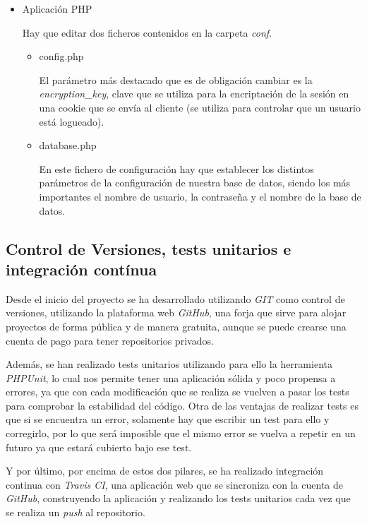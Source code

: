 \begin{itemize}
		\item Aplicación PHP

			Hay que editar dos ficheros contenidos en la carpeta \emph{conf}.

			\begin{itemize}
				\item config.php

				El parámetro más destacado que es de obligación cambiar es la \emph{encryption\_key}, clave que se utiliza para la encriptación de la sesión en una cookie que se envía al cliente (se utiliza para controlar que un usuario está logueado).

				\item database.php

				En este fichero de configuración hay que establecer los distintos parámetros de la configuración de nuestra base de datos, siendo los más importantes el nombre de usuario, la contraseña y el nombre de la base de datos.

			\end{itemize}

	\end{itemize}

\subsection{Control de Versiones, tests unitarios e integración contínua}

Desde el inicio del proyecto se ha desarrollado utilizando \emph{GIT} como control de versiones, utilizando la plataforma web \emph{GitHub}, una forja que sirve para alojar proyectos de forma pública y de manera gratuita, aunque se puede crearse una cuenta de pago para tener repositorios privados.

Además, se han realizado tests unitarios utilizando para ello la herramienta \emph{PHPUnit}, lo cual nos permite tener una aplicación sólida y poco propensa a errores, ya que con cada modificación que se realiza se vuelven a pasar los tests para comprobar la estabilidad del código. Otra de las ventajas de realizar tests es que si se encuentra un error, solamente hay que escribir un test para ello y corregirlo, por lo que será imposible que el mismo error se vuelva a repetir en un futuro ya que estará cubierto bajo ese test.

Y por último, por encima de estos dos pilares, se ha realizado integración continua con \emph{Travis CI}, una aplicación web que se sincroniza con la cuenta de \emph{GitHub}, construyendo la aplicación y realizando los tests unitarios cada vez que se realiza un \emph{push} al repositorio.

